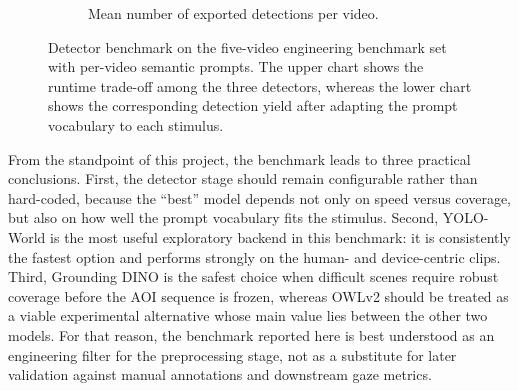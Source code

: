 \documentclass[11pt]{article}
\begin{document}
\begin{figure}[htbp]
    \begin{subfigure}{\textwidth}
        \centering
        \caption{Mean number of exported detections per video.}
    \end{subfigure}
    \caption{Detector benchmark on the five-video engineering benchmark set with per-video semantic prompts. The upper chart shows the runtime trade-off among the three detectors, whereas the lower chart shows the corresponding detection yield after adapting the prompt vocabulary to each stimulus.}
    \label{fig:detector-benchmark}
\end{figure}

From the standpoint of this project, the benchmark leads to three practical conclusions. First, the detector stage should remain configurable rather than hard-coded, because the ``best'' model depends not only on speed versus coverage, but also on how well the prompt vocabulary fits the stimulus. Second, YOLO-World is the most useful exploratory backend in this benchmark: it is consistently the fastest option and performs strongly on the human- and device-centric clips. Third, Grounding DINO is the safest choice when difficult scenes require robust coverage before the AOI sequence is frozen, whereas OWLv2 should be treated as a viable experimental alternative whose main value lies between the other two models. For that reason, the benchmark reported here is best understood as an engineering filter for the preprocessing stage, not as a substitute for later validation against manual annotations and downstream gaze metrics.
\end{document}
